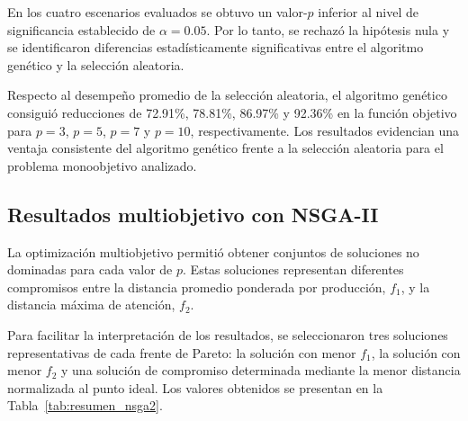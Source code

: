 \documentclass[journal]{IEEEtran}
\begin{document}
En los cuatro escenarios evaluados se obtuvo un valor-$p$ inferior al nivel de significancia establecido de $\alpha=0.05$. Por lo tanto, se rechazó la hipótesis nula y se identificaron diferencias estadísticamente significativas entre el algoritmo genético y la selección aleatoria.

Respecto al desempeño promedio de la selección aleatoria, el algoritmo genético consiguió reducciones de 72.91\%, 78.81\%, 86.97\% y 92.36\% en la función objetivo para $p=3$, $p=5$, $p=7$ y $p=10$, respectivamente. Los resultados evidencian una ventaja consistente del algoritmo genético frente a la selección aleatoria para el problema monoobjetivo analizado.


\subsection{Resultados multiobjetivo con NSGA-II}

La optimización multiobjetivo permitió obtener conjuntos de soluciones no dominadas para cada valor de $p$. Estas soluciones representan diferentes compromisos entre la distancia promedio ponderada por producción, $f_1$, y la distancia máxima de atención, $f_2$.

Para facilitar la interpretación de los resultados, se seleccionaron tres soluciones representativas de cada frente de Pareto: la solución con menor $f_1$, la solución con menor $f_2$ y una solución de compromiso determinada mediante la menor distancia normalizada al punto ideal. Los valores obtenidos se presentan en la Tabla~\ref{tab:resumen_nsga2}.
\end{document}
